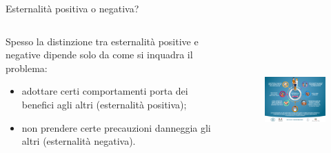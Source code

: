 \documentclass[aspectratio=64,11pt]{beamer}
\begin{document}
\begin{frame}{Esternalità positiva o negativa?}
\begin{columns}
\begin{column}{.4\columnwidth}
  Spesso la distinzione tra esternalità positive e negative dipende solo da come si inquadra il problema:
\begin{itemize}
\item adottare certi comportamenti porta dei benefici agli altri (esternalità positiva);
\item non prendere certe precauzioni danneggia gli altri (esternalità negativa).
\end{itemize}
\end{column}

\begin{column}{.6\columnwidth}
\begin{figure}[htbp]
\centering
\includegraphics[height=5cm]{./figure/locandina-corona.png}
\end{figure}
\end{column}
\end{columns}
\end{frame}
\end{document}
